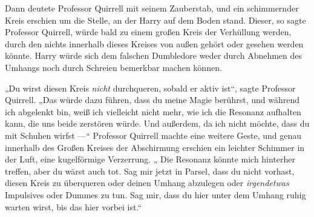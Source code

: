 Dann deutete Professor Quirrell mit seinem Zauberstab, und ein schimmernder Kreis erschien um die Stelle, an der Harry auf dem Boden stand. Dieser, so sagte Professor Quirrell, würde bald zu einem großen Kreis der Verhüllung werden, durch den nichts innerhalb dieses Kreises von außen gehört oder gesehen werden könnte. Harry würde sich dem falschen Dumbledore weder durch Abnehmen des Umhangs noch durch Schreien bemerkbar machen können.

„Du wirst diesen Kreis \emph{nicht} durchqueren, sobald er aktiv ist“, sagte Professor Quirrell.
„Das würde dazu führen, dass du meine Magie berührst, und während ich abgelenkt bin, weiß ich vielleicht nicht mehr, wie ich die Resonanz aufhalten kann, die uns beide zerstören würde. Und außerdem, da ich nicht möchte, dass du mit Schuhen wirfst —“ Professor Quirrell machte eine weitere Geste, und genau innerhalb des Großen Kreises der Abschirmung erschien ein leichter Schimmer in der Luft, eine kugelförmige Verzerrung. „ Die Resonanz könnte mich hinterher treffen, aber du wärst auch tot. Sag mir jetzt in Parsel, dass du nicht vorhast, diesen Kreis zu überqueren oder deinen Umhang abzulegen oder \emph{irgendetwas} Impulsives oder Dummes zu tun. Sag mir, dass du hier unter dem Umhang ruhig warten wirst, bis das hier vorbei ist.“

